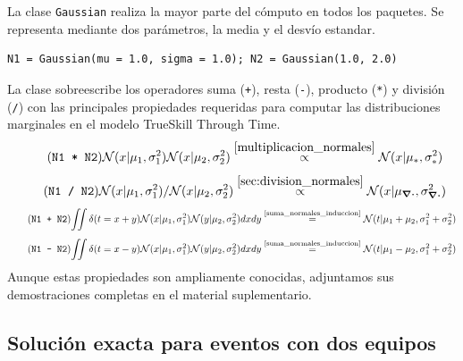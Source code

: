 \documentclass[a4paper,11pt]{book}
\newcommand{\N}{\mathcal{N}}
\theoremstyle{definition}
\begin{document}
La clase \texttt{Gaussian} realiza la mayor parte del cómputo en todos los paquetes.
%
Se representa mediante dos parámetros, la media y el desvío estandar.
\begin{lstlisting}[captionpos=b,backgroundcolor=\color{all},label=lst:N1_N2, caption={Inicialización de distribuciones gaussianas}, belowskip=0cm]
N1 = Gaussian(mu = 1.0, sigma = 1.0); N2 = Gaussian(1.0, 2.0)
\end{lstlisting}
%
La clase sobreescribe los operadores suma (\texttt{+}), resta (\texttt{-}), producto (\texttt{*}) y división (\texttt{/}) con las principales propiedades requeridas para computar las distribuciones marginales en el modelo TrueSkill Through Time.
%
\begin{equation*} \tag{\texttt{N1 * N2}}
 \N(x|\mu_1,\sigma_1^2)\N(x|\mu_2,\sigma_2^2) \overset{\ref{multiplicacion_normales}}{\propto} \N(x|\mu_{*},\sigma_{*}^2)
\end{equation*}
%
\begin{equation*} \tag{\texttt{N1 / N2}}
 \N(x|\mu_1,\sigma_1^2)/\N(x|\mu_2,\sigma_2^2)  \overset{\ref{sec:division_normales}}{\propto} \N(x|\mu_{\div},\sigma_{\div}^2)
\end{equation*}
%
\vspace{-0.3cm}
%
\begin{equation*} \tag{\texttt{N1 + N2}} \label{eq:suma_normales}
\begin{split}
\iint \delta(t=x + y) \N(x|\mu_1, \sigma_1^2)\N(y|\mu_2, \sigma_2^2) dxdy \overset{\text{\ref{suma_normales_induccion}}}{=} \N(t|\mu_1+\mu_2,\sigma_1^2 + \sigma_2^2)
\end{split}
\end{equation*}
%
\vspace{-0.5cm}
%
\begin{equation*} \tag{\texttt{N1 - N2}} \label{eq:resta_normales}
\begin{split}
\iint \delta(t = x - y) \N(x|\mu_1, \sigma_1^2)\N(y|\mu_2, \sigma_2^2) dxdy \overset{\text{\ref{suma_normales_induccion}}}{=} \N(t|\mu_1 - \mu_2,\sigma_1^2 + \sigma_2^2)
\end{split}
\end{equation*}
%
Aunque estas propiedades son ampliamente conocidas, adjuntamos sus demostraciones completas en el material suplementario.

\subsection{Solución exacta para eventos con dos equipos}\label{sec:2vs2}
\end{document}
